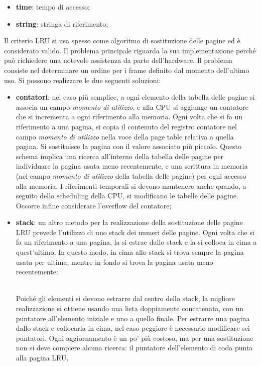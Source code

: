 \documentclass{article}
\begin{document}
				\begin{itemize}
					\item \textbf{time}: tempo di accesso;
					\item \textbf{string}: stringa di riferimento;
				\end{itemize}
				Il criterio LRU si usa spesso come algoritmo di sostituzione delle pagine ed è considerato valido. Il problema principale riguarda la sua implementazione perché può richiedere una notevole assistenza da parte dell’hardware. Il problema consiste nel determinare un ordine per i frame definito dal momento dell’ultimo uso. Si possono realizzare le due seguenti soluzioni:
				\begin{itemize}
					\item \textbf{contatori}: nel caso più semplice, a ogni elemento della tabella delle pagine si associa un campo \textit{momento di utilizzo}, e alla CPU si aggiunge un contatore che si incrementa a ogni riferimento alla memoria. Ogni volta che si fa un riferimento a una pagina, si copia il contenuto del registro contatore nel campo \textit{momento di utilizzo} nella voce della page table relativa a quella pagina. Si sostituisce la pagina con il valore associato più piccolo. Questo schema implica una ricerca all’interno della tabella delle pagine per individuare la pagina usata meno recentemente, e una scrittura in memoria (nel campo \textit{momento di utilizzo} della tabella delle pagine) per ogni accesso alla memoria. I riferimenti temporali si devono mantenere anche quando, a seguito dello scheduling della CPU, si modificano le tabelle delle pagine. Occorre infine considerare l’overflow del contatore;
					\item \textbf{stack}: un altro metodo per la realizzazione della sostituzione delle pagine LRU prevede l’utilizzo di uno stack dei numeri delle pagine. Ogni volta che si fa un riferimento a una pagina, la si estrae dallo stack e la si colloca in cima a quest’ultimo. In questo modo, in cima allo stack si trova sempre la pagina usata per ultima, mentre in fondo si trova la pagina usata meno recentemente:
					\begin{figure}[ht!]
					\end{figure}
					\\Poiché gli elementi si devono estrarre dal centro dello stack, la migliore realizzazione si ottiene usando una lista doppiamente concatenata, con un puntatore all’elemento iniziale e uno a quello finale. Per estrarre una pagina dallo stack e collocarla in cima, nel caso peggiore è necessario modificare sei puntatori. Ogni aggiornamento è un po’ più costoso, ma per una sostituzione non si deve compiere alcuna ricerca: il puntatore dell’elemento di coda punta alla pagina LRU.
				\end{itemize}
\end{document}

